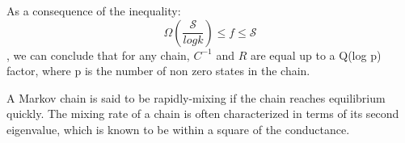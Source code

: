 \begin{frame} 
As a consequence of the inequality:
$$\Omega (\frac{\mathscr{S}}{log k}) \le f \le \mathscr{S}$$ , we can conclude that for any chain, $C^{-1}$ and
$R$ are equal up to a Q(log p) factor, where p is the number of non zero states in the chain.

A Markov chain is said to be rapidly-mixing if the chain reaches equilibrium
quickly. The mixing rate of a chain is often characterized in terms of its second
eigenvalue, which is known to be within a square of the conductance. 
\end{frame}

